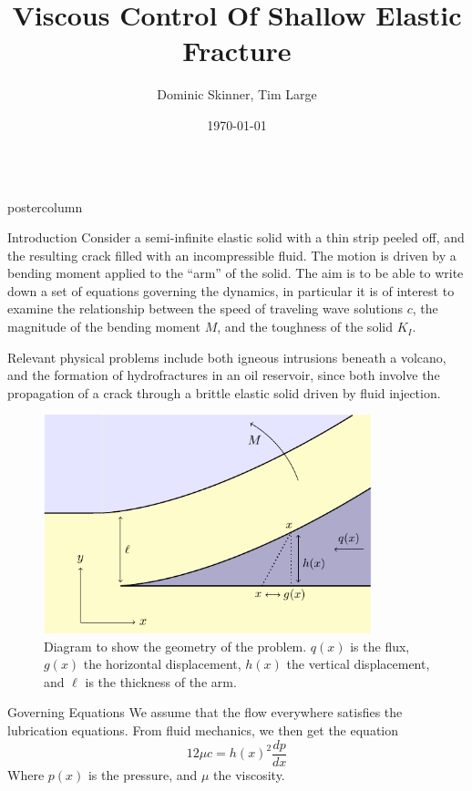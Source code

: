 \documentclass{beamer}
\title{\huge Viscous Control Of Shallow Elastic Fracture}
\author{Dominic Skinner, Tim Large}
\institute[Univerity of Cambridge]
{DAMTP, University of Cambridge}
\date{\today}
\newlength{\columnheight}
\begin{document}
\begin{frame}
\begin{columns}
	\begin{column}{.43\textwidth}
		\begin{beamercolorbox}[center]{postercolumn}
			\begin{minipage}{.98\textwidth}  %
				\parbox[t][\columnheight]{\textwidth}{ %
\begin{myblock}{Introduction}
Consider a semi-infinite elastic solid with a thin strip peeled off, and the
resulting crack filled with an incompressible fluid. The motion is driven
by a bending moment applied to the ``arm'' of the solid. The aim is to be
able to write down a set of equations governing the dynamics, in particular
it is of interest to examine the relationship between the speed of traveling
wave solutions $c$, the magnitude of the bending moment $M$, and the toughness 
of the solid $K_I$. 

Relevant physical problems include both igneous intrusions beneath a volcano,
and the formation of hydrofractures in an oil
reservoir, since both involve the propagation of a crack through a brittle 
elastic solid driven by fluid injection.

\begin{figure}
\centering\includegraphics[width=0.85\textwidth]{Fig1.pdf}
\caption{Diagram to show the geometry of the problem. $q(x)$ is the flux,
$g(x)$ the horizontal displacement, $h(x)$ the vertical displacement, and
$\ell$ is the thickness of the arm.}
\end{figure}
\end{myblock}\vfill
\begin{myblock}{Governing Equations}
We assume that the flow everywhere satisfies the lubrication equations. From 
fluid mechanics, we then get the equation
\[12\mu c = h(x)^2 \frac{dp}{dx}\]
Where $p(x)$ is the pressure, and $\mu$ the viscosity.


\end{myblock}}
\end{minipage}
\end{beamercolorbox}
\end{column}
\end{columns}
\end{frame}
\end{document}
